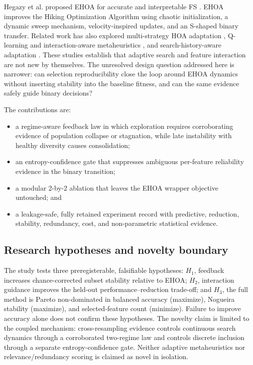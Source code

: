 \documentclass[11pt]{article}
\begin{document}
Hegazy et al. proposed EHOA for accurate and interpretable FS
\cite{hegazy2026ehoa}. EHOA improves the Hiking Optimization Algorithm using
chaotic initialization, a dynamic sweep mechanism, velocity-inspired updates,
and an S-shaped binary transfer. Related work has also explored multi-strategy
HOA adaptation \cite{abdelsalam2025aedhoa}, Q-learning and interaction-aware
metaheuristics \cite{zhang2025tqfeo}, and search-history-aware adaptation
\cite{lian2025tam}. These studies establish that adaptive search and feature
interaction are not new by themselves. The unresolved design question addressed
here is narrower: can selection reproducibility close the loop around EHOA
dynamics without inserting stability into the baseline fitness, and can the
same evidence safely guide binary decisions?

The contributions are:
\begin{itemize}
  \item a regime-aware feedback law in which exploration requires corroborating
  evidence of population collapse or stagnation, while late instability with
  healthy diversity causes consolidation;
  \item an entropy-confidence gate that suppresses ambiguous per-feature
  reliability evidence in the binary transition;
  \item a modular 2-by-2 ablation that leaves the EHOA wrapper objective
  untouched; and
  \item a leakage-safe, fully retained experiment record with predictive,
  reduction, stability, redundancy, cost, and non-parametric statistical
  evidence.
\end{itemize}

\subsection{Research hypotheses and novelty boundary}
The study tests three preregisterable, falsifiable hypotheses: $H_1$, feedback
increases chance-corrected subset stability relative to EHOA; $H_2$, interaction
guidance improves the held-out performance--reduction trade-off; and $H_3$, the
full method is Pareto non-dominated in balanced accuracy (maximize), Nogueira
stability (maximize), and selected-feature count (minimize). Failure to improve
accuracy alone does not confirm these hypotheses. The novelty claim is limited
to the coupled mechanism: cross-resampling evidence controls continuous search
dynamics through a corroborated two-regime law and controls discrete inclusion
through a separate entropy-confidence gate. Neither adaptive metaheuristics nor
relevance/redundancy scoring is claimed as novel in isolation.
\end{document}
